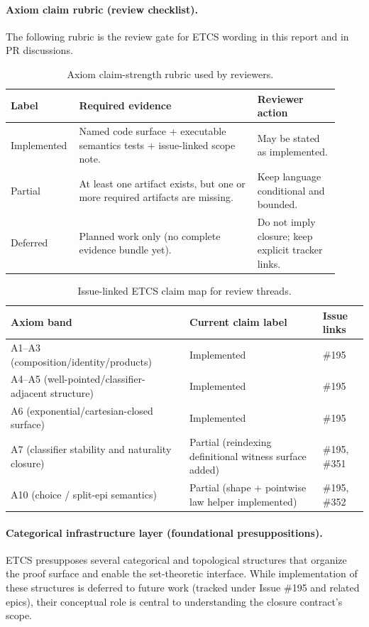 \documentclass[11pt, a4paper]{report}
\begin{document}
\paragraph{Axiom claim rubric (review checklist).}
The following rubric is the review gate for ETCS wording in this report and in PR discussions.
\begin{table}[ht]
\centering
\caption{Axiom claim-strength rubric used by reviewers.}
\label{table:etcs-claim-rubric}
\begin{tabular}{p{0.16\linewidth}p{0.52\linewidth}p{0.24\linewidth}}
\toprule
\textbf{Label} & \textbf{Required evidence} & \textbf{Reviewer action} \\
\midrule
Implemented & Named code surface + executable semantics tests + issue-linked scope note. & May be stated as implemented. \\
Partial & At least one artifact exists, but one or more required artifacts are missing. & Keep language conditional and bounded. \\
Deferred & Planned work only (no complete evidence bundle yet). & Do not imply closure; keep explicit tracker links. \\
\bottomrule
\end{tabular}
\end{table}

\begin{table}[ht]
\centering
\caption{Issue-linked ETCS claim map for review threads.}
\label{table:etcs-claim-map}
\begin{tabular}{lll}
\toprule
\textbf{Axiom band} & \textbf{Current claim label} & \textbf{Issue links} \\
\midrule
A1--A3 (composition/identity/products) & Implemented & \#195 \\
A4--A5 (well-pointed/classifier-adjacent structure) & Implemented & \#195 \\
A6 (exponential/cartesian-closed surface) & Implemented & \#195 \\
A7 (classifier stability and naturality closure) & Partial (reindexing definitional witness surface added) & \#195, \#351 \\
A10 (choice / split-epi semantics) & Partial (shape + pointwise law helper implemented) & \#195, \#352 \\
\bottomrule
\end{tabular}
\end{table}

\paragraph{Categorical infrastructure layer (foundational presuppositions).}
ETCS presupposes several categorical and topological structures that organize the proof surface and enable the set-theoretic interface. While implementation of these structures is deferred to future work (tracked under Issue \#195 and related epics), their conceptual role is central to understanding the closure contract's scope.
\end{document}
